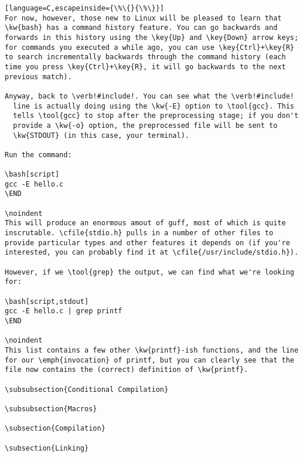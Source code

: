 \documentclass[a4paper,10pt]{article}
\newcommand{\kw}[1]{\texttt{#1}}
\newcommand{\key}[1]{\texttt{#1}}
\newcommand{\cfile}[1]{\texttt{#1}}
\newcommand{\tool}[1]{\texttt{#1}}
\begin{document}
\begin{lstlisting}[language=C,escapeinside={\%\{}{\%\}}]
For now, however, those new to Linux will be pleased to learn that
\kw{bash} has a command history feature. You can go backwards and
forwards in this history using the \key{Up} and \key{Down} arrow keys;
for commands you executed a while ago, you can use \key{Ctrl}+\key{R}
to search incrementally backwards through the command history (each
time you press \key{Ctrl}+\key{R}, it will go backwards to the next
previous match).

Anyway, back to \verb!#include!. You can see what the \verb!#include!
  line is actually doing using the \kw{-E} option to \tool{gcc}. This
  tells \tool{gcc} to stop after the preprocessing stage; if you don't
  provide a \kw{-o} option, the preprocessed file will be sent to
  \kw{STDOUT} (in this case, your terminal).

Run the command:

\bash[script]
gcc -E hello.c
\END

\noindent
This will produce an enormous amout of guff, most of which is quite
inscrutable. \cfile{stdio.h} pulls in a number of other files to
provide particular types and other features it depends on (if you're
interested, you can probably find it at \cfile{/usr/include/stdio.h}).

However, if we \tool{grep} the output, we can find what we're looking
for:

\bash[script,stdout]
gcc -E hello.c | grep printf
\END

\noindent
This list contains a few other \kw{printf}-ish functions, and the line
for our \emph{invocation} of printf, but you can clearly see that the
file now contains the (correct) definition of \kw{printf}.

\subsubsection{Conditional Compilation}

\subsubsection{Macros}

\subsection{Compilation}

\subsection{Linking}


\end{lstlisting}
\end{document}
